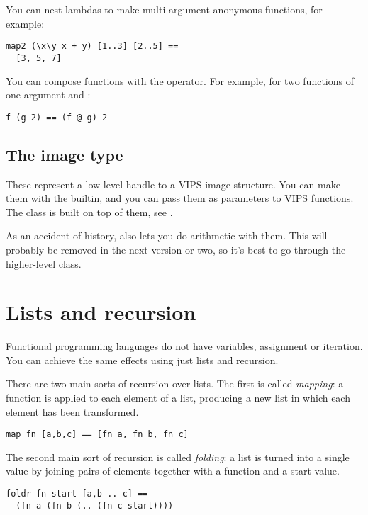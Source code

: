 You can nest lambdas to make multi-argument anonymous functions, for example:

\begin{verbatim}
map2 (\x\y x + y) [1..3] [2..5] == 
  [3, 5, 7]
\end{verbatim}

You can compose functions with the  operator. For example, for two
functions of one argument  and :

\begin{verbatim}
f (g 2) == (f @ g) 2
\end{verbatim}

\subsection{The image type}

These represent a low-level handle to a VIPS image structure. You can make
them with the  builtin, and you can pass them as parameters to
VIPS functions. The  class is built on top of them,
see .

As an accident of history, \nip{} also lets you do arithmetic with them. This
will probably be removed in the next version or two, so it's best to go
through the higher-level  class.

\section{Lists and recursion}

Functional programming languages do not have variables, assignment or
iteration. You can achieve the same effects using just lists and recursion.

There are two main sorts of recursion over lists. The first is called 
\emph{mapping}: a function is applied to each element of a list, producing
a new list in which each element has been transformed.

\begin{verbatim}
map fn [a,b,c] == [fn a, fn b, fn c]
\end{verbatim}

The second main sort of recursion is called \emph{folding}: a list is turned
into a single value by joining pairs of elements together with a function and
a start value.

\begin{verbatim}
foldr fn start [a,b .. c] == 
  (fn a (fn b (.. (fn c start))))
\end{verbatim}

